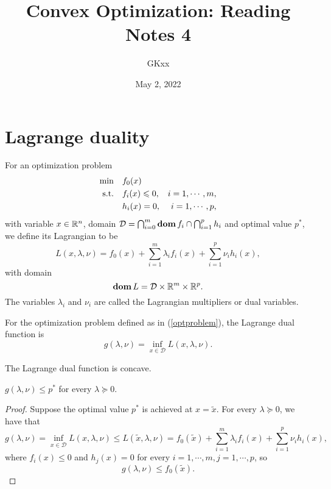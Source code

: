\documentclass[12pt]{article}
\title{Convex Optimization: Reading Notes 4}
\author{GKxx}
\date{May 2, 2022}
\begin{document}
\maketitle

\section{Lagrange duality}

\begin{definition}[Lagrangian]
    For an optimization problem
    \begin{equation}\label{optproblem}
        \begin{aligned}
            \min\quad & f_0(x)&\\
            \textnormal{s.t.}\quad &f_i(x)\leqslant 0, &i=1,\cdots,m,\\
            &h_i(x)=0,&i=1,\cdots,p,
        \end{aligned}
    \end{equation}
    with variable \(x\in\mathbb R^n\), domain \(\mathcal D=\bigcap_{i=0}^m\operatorname{\mathbf{dom}} f_i\cap\bigcap_{i=1}^ph_i\) and optimal value \(p^\ast\), we define its \textnormal{Lagrangian} to be
    \[L(x,\lambda,\nu)=f_0(x)+\sum_{i=1}^m\lambda_if_i(x)+\sum_{i=1}^p\nu_ih_i(x),\]
    with domain
    \[\operatorname{\mathbf{dom}} L=\mathcal D\times\mathbb R^m\times\mathbb R^p.\]
    The variables \(\lambda_i\) and \(\nu_i\) are called the \textnormal{Lagrangian multipliers} or \textnormal{dual variables}.
\end{definition}

\begin{definition}
    For the optimization problem defined as in (\ref{optproblem}), the \textnormal{Lagrange dual function} is
    \[g(\lambda,\nu)=\inf_{x\in\mathcal D}L(x,\lambda,\nu).\]
\end{definition}

\begin{remark}
    The Lagrange dual function is concave.
\end{remark}

\begin{proposition}
    \(g(\lambda,\nu)\leqslant p^\ast\) for every \(\lambda\succeq 0\).
\end{proposition}
\begin{proof}
    Suppose the optimal value \(p^\ast\) is achieved at \(x=\tilde x\). For every \(\lambda\succeq 0\), we have that
    \[g(\lambda,\nu)=\inf_{x\in\mathcal D}L(x,\lambda,\nu)\leqslant L(\tilde x,\lambda,\nu)=f_0(\tilde x)+\sum_{i=1}^m\lambda_if_i(x)+\sum_{i=1}^p\nu_ih_i(x),\]
    where \(f_i(x)\leqslant 0\) and \(h_j(x)=0\) for every \(i=1,\cdots,m,j=1,\cdots,p\), so
    \[g(\lambda,\nu)\leqslant f_0(\tilde x).\]
\end{proof}
\end{document}
